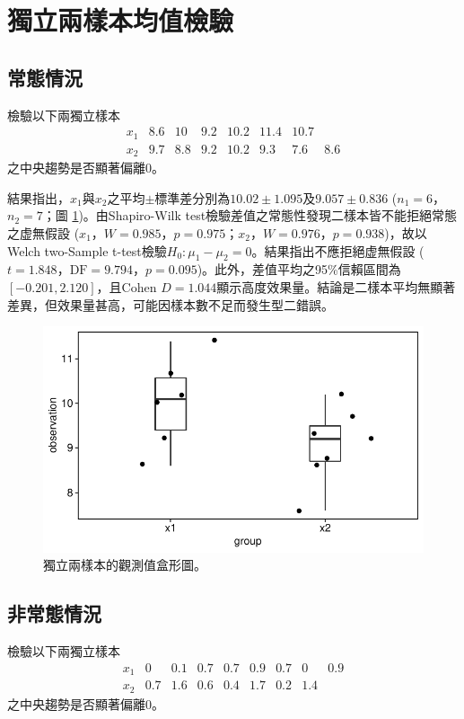 \documentclass[12pt]{article}
\begin{document}
\section{獨立兩樣本均值檢驗}
\subsection{常態情況}
檢驗以下兩獨立樣本
\[
\begin{matrix}
x_1 & 8.6 & 10 & 9.2 & 10.2 & 11.4 & 10.7 & \\
x_2 & 9.7 & 8.8 & 9.2 & 10.2 & 9.3 & 7.6 & 8.6
\end{matrix}
\]
之中央趨勢是否顯著偏離0。

結果指出，$x_1$與$x_2$之平均$\pm$標準差分別為$10.02 \pm 1.095$及$9.057 \pm 0.836$ ($n_1 = 6$，$n_2 = 7$；圖 \ref{fig:normal_independent_test})。由Shapiro-Wilk test檢驗差值之常態性發現二樣本皆不能拒絕常態之虚無假設 ($x_1$，$W = 0.985$，$p = 0.975$；$x_2$，$W = 0.976$，$p = 0.938$)，故以Welch two-Sample t-test檢驗$H_0: \mu_1 - \mu_2 = 0$。結果指出不應拒絕虚無假設 ($t = 1.848$，$\text{DF} = 9.794$，$p = 0.095$)。此外，差值平均之95\%信賴區間為$\left[-0.201, 2.120\right]$，且Cohen $D = 1.044$顯示高度效果量。結論是二樣本平均無顯著差異，但效果量甚高，可能因樣本數不足而發生型二錯誤。

\begin{figure}[htb!]
	\centering
	\includegraphics[]{normal_independent_test.pdf}
	\caption{獨立兩樣本的觀測值盒形圖。}
	\label{fig:normal_independent_test}
\end{figure}

\subsection{非常態情況}
檢驗以下兩獨立樣本
\[
\begin{matrix}
x_1 & 0 & 0.1 & 0.7 & 0.7 & 0.9 & 0.7 & 0 & 0.9 \\
x_2 & 0.7 & 1.6 & 0.6 & 0.4 & 1.7 & 0.2 & 1.4 & 
\end{matrix}
\]
之中央趨勢是否顯著偏離0。
\end{document}
